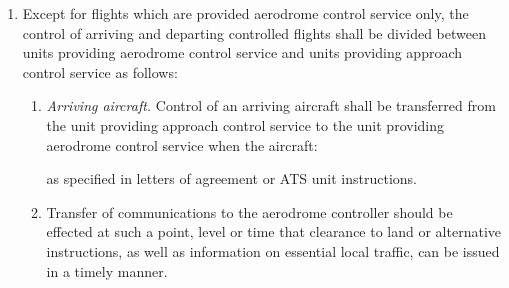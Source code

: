 \documentclass[../vATM.tex]{subfiles}
\begin{document}
    \begin{enumerate}
        \item Except for flights which are provided aerodrome control service only, the control of arriving and departing controlled flights shall be divided between units providing aerodrome control service and units providing approach control service as follows:
        
        \begin{enumerate}
            \item \textit{Arriving aircraft.} Control of an arriving aircraft shall be transferred from the unit providing approach control service to the unit providing aerodrome control service when the aircraft:
            
            
            \noindent as specified in letters of agreement or ATS unit instructions.
            
            \item \label{4.3.2.1.2} Transfer of communications to the aerodrome controller should be effected at such a point, level or time that clearance to land or alternative instructions, as well as information on essential local traffic, can be issued in a timely manner. \par
            

\end{enumerate}
\end{enumerate}
\end{document}
